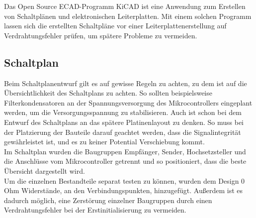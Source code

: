 
Das Open Source ECAD-Programm KiCAD ist eine Anwendung zum Erstellen von Schaltplänen und elektronischen Leiterplatten. Mit einem solchen Programm lassen sich die erstellten Schaltpläne vor einer Leiterplattenerstellung auf Verdrahtungsfehler prüfen, um spätere Probleme zu vermeiden.

\subsection{Schaltplan}
Beim Schaltplanentwurf gilt es auf gewisse Regeln zu achten, zu dem ist auf die Übersichtlichkeit des Schaltplans zu achten.
So sollten beispielsweise Filterkondensatoren an der Spannungsversorgung des Mikrocontrollers eingeplant werden, um die Versorgungsspannung zu stabilisieren. Auch ist schon bei dem Entwurf des Schaltplans an das spätere Platinenlayout zu denken. So muss bei der Platzierung der Bauteile darauf geachtet werden, dass die Signalintegrität gewährleistet ist, und es zu keiner Potential Verschiebung kommt.\\
Im Schaltplan wurden die Baugruppen Empfänger, Sender, Hochsetzsteller und die Anschlüsse vom Mikrocontroller getrennt und so positioniert, dass die beste Übersicht dargestellt wird.\\
Um die einzelnen Bestandteile separat testen zu können, wurden dem Design 0\,Ohm Widerstände, an den Verbindungspunkten, hinzugefügt. Außerdem ist es dadurch möglich, eine Zerstörung einzelner Baugruppen durch einen Verdrahtungsfehler bei der Erstinitialisierung zu vermeiden.\\   

